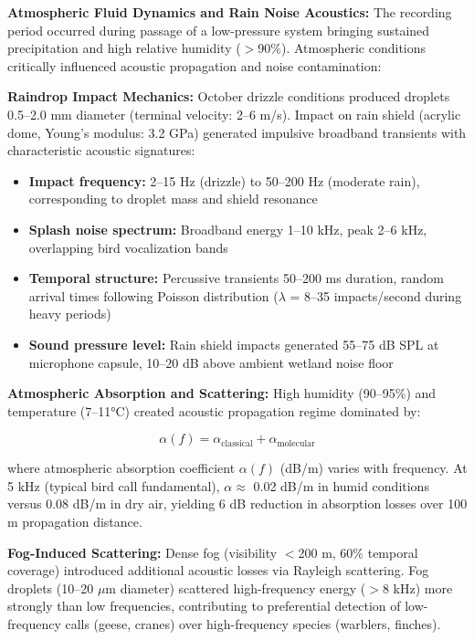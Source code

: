 \documentclass[twocolumn]{article}
\begin{document}
\textbf{Atmospheric Fluid Dynamics and Rain Noise Acoustics:} The recording period occurred during passage of a low-pressure system bringing sustained precipitation and high relative humidity ($>$90\%). Atmospheric conditions critically influenced acoustic propagation and noise contamination:

\textbf{Raindrop Impact Mechanics:} October drizzle conditions produced droplets 0.5--2.0 mm diameter (terminal velocity: 2--6 m/s). Impact on rain shield (acrylic dome, Young's modulus: 3.2 GPa) generated impulsive broadband transients with characteristic acoustic signatures:

\begin{itemize}
\item \textbf{Impact frequency:} 2--15 Hz (drizzle) to 50--200 Hz (moderate rain), corresponding to droplet mass and shield resonance
\item \textbf{Splash noise spectrum:} Broadband energy 1--10 kHz, peak 2--6 kHz, overlapping bird vocalization bands
\item \textbf{Temporal structure:} Percussive transients 50--200 ms duration, random arrival times following Poisson distribution ($\lambda$ = 8--35 impacts/second during heavy periods)
\item \textbf{Sound pressure level:} Rain shield impacts generated 55--75 dB SPL at microphone capsule, 10--20 dB above ambient wetland noise floor
\end{itemize}

\textbf{Atmospheric Absorption and Scattering:} High humidity (90--95\%) and temperature (7--11°C) created acoustic propagation regime dominated by:

\begin{equation}
\alpha(f) = \alpha_{\text{classical}} + \alpha_{\text{molecular}}
\end{equation}

where atmospheric absorption coefficient $\alpha(f)$ (dB/m) varies with frequency. At 5 kHz (typical bird call fundamental), $\alpha \approx$ 0.02 dB/m in humid conditions versus 0.08 dB/m in dry air, yielding 6 dB reduction in absorption losses over 100 m propagation distance.

\textbf{Fog-Induced Scattering:} Dense fog (visibility $<$200 m, 60\% temporal coverage) introduced additional acoustic losses via Rayleigh scattering. Fog droplets (10--20 $\mu$m diameter) scattered high-frequency energy ($>$8 kHz) more strongly than low frequencies, contributing to preferential detection of low-frequency calls (geese, cranes) over high-frequency species (warblers, finches).
\end{document}
